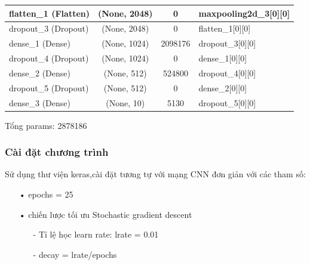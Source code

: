 \documentclass[a4paper,12pt]{report}
\begin{document}
{\begin{center}
\begin{longtable}{lccl}
\hline
flatten\_1 (Flatten)        &      (None, 2048) &         0    &       maxpooling2d\_3[0][0]    \\        

\hline
dropout\_3 (Dropout)    &          (None, 2048)  &        0   &        flatten\_1[0][0]    \\              

\hline
dense\_1 (Dense)      &            (None, 1024)     &     2098176   &  dropout\_3[0][0]    \\              

\hline
dropout\_4 (Dropout)  &            (None, 1024)  &        0  &         dense\_1[0][0]      \\              
\hline
dense\_2 (Dense)       &           (None, 512)  &         524800&      dropout\_4[0][0]        \\          

\hline
dropout\_5 (Dropout)    &          (None, 512) &          0      &     dense\_2[0][0]        \\           

\hline
dense\_3 (Dense)         &         (None, 10) &           5130    &    dropout\_5[0][0]          \\        

\hline
\end{longtable} 
\end{center}
}
Tổng params: 2878186
\subsubsection{Cài đặt chương trình}
Sử dụng thư viện keras,cài đặt tương tự với mạng CNN đơn giản với các tham số:
\begin{itemize}
\item[•] epochs = 25
\item[•] chiến lược tối ưu Stochastic gradient descent
\begin{itemize}
\item[-] Tỉ lệ học learn rate: lrate = 0.01
\item[-] decay = lrate/epochs
\end{itemize}
\end{itemize}
\end{document}
